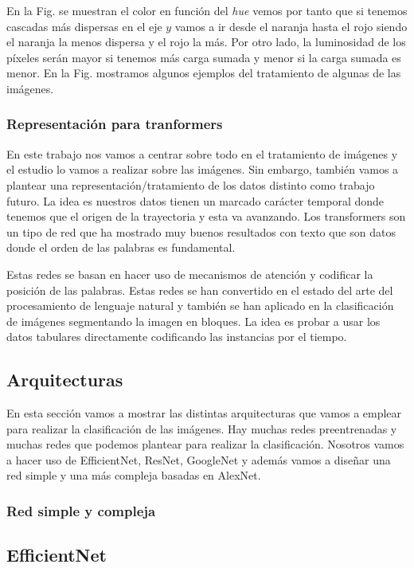 \documentclass[a4paper,12pt,twoside,titlepage]{article}
\begin{document}
En la Fig. se muestran el color en función del \textit{hue} vemos por tanto que si tenemos cascadas más dispersas en el eje $y$ vamos a ir desde el naranja hasta el rojo siendo el naranja la menos dispersa y el rojo la más. Por otro lado, la luminosidad de los píxeles serán mayor si tenemos más carga sumada y menor si la carga sumada es menor. En la Fig. mostramos algunos ejemplos del tratamiento de algunas de las imágenes.


\subsubsection*{Representación para tranformers}

En este trabajo nos vamos a centrar sobre todo en el tratamiento de imágenes y el estudio lo vamos a realizar sobre las imágenes. Sin embargo, también vamos a plantear una representación/tratamiento de los datos distinto como trabajo futuro. La idea es nuestros datos tienen un marcado carácter temporal donde tenemos que el origen de la trayectoria y esta va avanzando. Los transformers son un tipo de red que ha mostrado muy buenos resultados con texto que son datos donde el orden de las palabras es fundamental. 

Estas redes se basan en hacer uso de mecanismos de atención y codificar la posición de las palabras. Estas redes se han convertido en el estado del arte del procesamiento de lenguaje natural y también se han aplicado en la clasificación de imágenes segmentando la imagen en bloques. La idea es probar a usar los datos tabulares directamente codificando las instancias por el tiempo.

\subsection{Arquitecturas}

En esta sección vamos a mostrar las distintas arquitecturas que vamos a emplear para realizar la clasificación de las imágenes. Hay muchas redes preentrenadas y muchas redes que podemos plantear para realizar la clasificación. Nosotros vamos a hacer uso de EfficientNet, ResNet, GoogleNet y además vamos a diseñar una red simple y una más compleja basadas en AlexNet.

\subsubsection*{Red simple y compleja}

\subsection*{EfficientNet}
\end{document}
